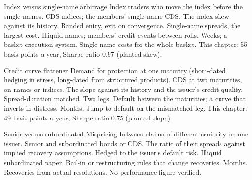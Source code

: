 \begin{strategyfile}{Index versus single-name arbitrage}\label{strat:s2:credit-relative-value:index}
 Index traders who move the index before the single names.
 CDS indices; the members' single-name CDS.
 The index skew against its history.
 Banded entry, exit on convergence.
 Single-name spreads, the largest cost.
 Illiquid names; members' credit events between rolls.
 Weeks; a basket execution system.
 Single-name costs for the whole basket.
 This chapter: 55 basis points a year, Sharpe ratio 0.97 (planted skew).
\end{strategyfile}

\begin{strategyfile}{Credit curve flattener}\label{strat:s2:credit-relative-value:curve}
 Demand for protection at one maturity (short-dated hedging in stress, long-dated from structured products).
 CDS at two maturities, on names or indices.
 The slope against its history and the issuer's credit quality.
 Spread-duration matched.
 Two legs.
 Default between the maturities; a curve that inverts in distress.
 Months.
 Jump-to-default on the mismatched leg.
 This chapter: 49 basis points a year, Sharpe ratio 0.75 (planted slope).
\end{strategyfile}

\begin{strategyfile}{Senior versus subordinated}\label{strat:s2:credit-relative-value:seniority}
 Mispricing between claims of different seniority on one issuer.
 Senior and subordinated bonds or CDS.
 The ratio of their spreads against implied recovery assumptions.
 Hedged to the issuer's default risk.
 Illiquid subordinated paper.
 Bail-in or restructuring rules that change recoveries.
 Months.
 Recoveries from actual resolutions.
 No performance figure verified.
\end{strategyfile}

